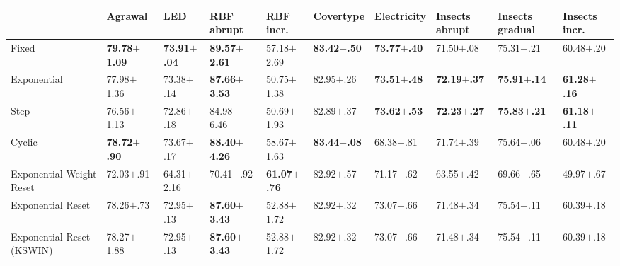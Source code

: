 \begin{tabular}{llllllllll}
    \toprule
                              & Agrawal                  & LED                     & RBF abrupt               & RBF incr.               & Covertype               & Electricity             & Insects abrupt          & Insects gradual         & Insects incr.           \\ \midrule
    Fixed                     & \bfseries 79.78$\pm$1.09 & \bfseries 73.91$\pm$.04 & \bfseries 89.57$\pm$2.61 & 57.18$\pm$2.69          & \bfseries 83.42$\pm$.50 & \bfseries 73.77$\pm$.40 & 71.50$\pm$.08           & 75.31$\pm$.21           & 60.48$\pm$.20           \\
    Exponential               & 77.98$\pm$1.36           & 73.38$\pm$.14           & \bfseries 87.66$\pm$3.53 & 50.75$\pm$1.38          & 82.95$\pm$.26           & \bfseries 73.51$\pm$.48 & \bfseries 72.19$\pm$.37 & \bfseries 75.91$\pm$.14 & \bfseries 61.28$\pm$.16 \\
    Step                      & 76.56$\pm$1.13           & 72.86$\pm$.18           & 84.98$\pm$6.46           & 50.69$\pm$1.93          & 82.89$\pm$.37           & \bfseries 73.62$\pm$.53 & \bfseries 72.23$\pm$.27 & \bfseries 75.83$\pm$.21 & \bfseries 61.18$\pm$.11 \\
    Cyclic                    & \bfseries 78.72$\pm$.90  & 73.67$\pm$.17           & \bfseries 88.40$\pm$4.26 & 58.67$\pm$1.63          & \bfseries 83.44$\pm$.08 & 68.38$\pm$.81           & 71.74$\pm$.39           & 75.64$\pm$.06           & 60.48$\pm$.20           \\
    Exponential Weight Reset  & 72.03$\pm$.91            & 64.31$\pm$2.16          & 70.41$\pm$.92            & \bfseries 61.07$\pm$.76 & 82.92$\pm$.57           & 71.17$\pm$.62           & 63.55$\pm$.42           & 69.66$\pm$.65           & 49.97$\pm$.67           \\
    Exponential Reset         & 78.26$\pm$.73            & 72.95$\pm$.13           & \bfseries 87.60$\pm$3.43 & 52.88$\pm$1.72          & 82.92$\pm$.32           & 73.07$\pm$.66           & 71.48$\pm$.34           & 75.54$\pm$.11           & 60.39$\pm$.18           \\
    Exponential Reset (KSWIN) & 78.27$\pm$1.88           & 72.95$\pm$.13           & \bfseries 87.60$\pm$3.43 & 52.88$\pm$1.72          & 82.92$\pm$.32           & 73.07$\pm$.66           & 71.48$\pm$.34           & 75.54$\pm$.11           & 60.39$\pm$.18           \\
    \bottomrule
\end{tabular}
